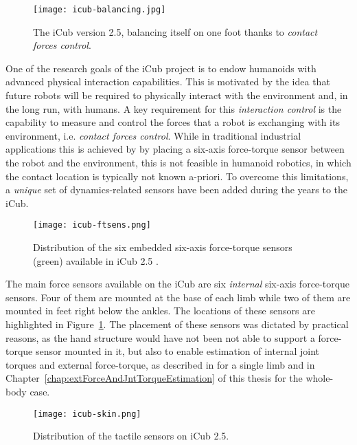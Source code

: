 \begin{figure}[H]
\caption{The iCub version 2.5, balancing itself on one foot thanks to \emph{contact forces control}.}
\centering
\texttt{[image: icub-balancing.jpg]}
\end{figure}

One of the research goals of the iCub project is 
to endow humanoids with advanced physical interaction capabilities. This is motivated by the idea that future robots will be required to physically interact with the environment and, in the long run, with humans. 
A key requirement for this \emph{interaction control} is the capability to measure and control the forces that a robot is exchanging with its environment, i.e. \emph{contact forces control}. While in traditional industrial applications this is achieved by by placing a six-axis force-torque sensor between the robot and the environment, this is not feasible in humanoid robotics, in which the contact location is typically not known a-priori. To overcome this limitations, a \emph{unique} set of dynamics-related sensors have been added during the years to the iCub. 

\begin{figure}[H]
\centering
\texttt{[image: icub-ftsens.png]}
\caption{Distribution of the six embedded six-axis force-torque sensors (green) available in iCub 2.5 .}
\label{fig:icub-ftsens}
\end{figure}

The main force sensors available on the iCub are six \emph{internal} six-axis force-torque sensors. Four of them are mounted at the base of each limb while two of them are mounted in feet right below the ankles. The locations of these sensors are highlighted in Figure~\ref{fig:icub-ftsens}. The placement of these sensors was dictated by practical reasons, as the hand structure would have not been not able to support a force-torque sensor mounted in it, but also to enable estimation of internal joint torques and external force-torque, as described in \citep{fumagalli2010learning} for a single limb and in Chapter~\ref{chap:extForceAndJntTorqueEstimation} of this thesis for the whole-body case.

\begin{figure}[h]

\centering
\texttt{[image: icub-skin.png]}
\caption{Distribution of the tactile sensors on iCub 2.5.}
\label{fig:icub-skin}
\end{figure}

